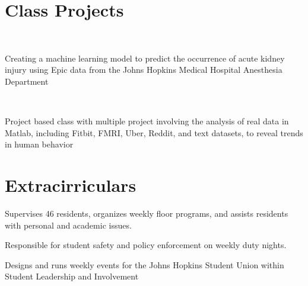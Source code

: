 \documentclass[]{deedy-resume}
\begin{document}
\begin{minipage}[t]{0.66\textwidth} 
\section{Class Projects}
 \\
\vspace{\topsep} %
\begin{tightemize}
\item Creating a machine learning model to predict the occurrence of acute kidney injury using Epic data from the Johns Hopkins Medical Hospital Anesthesia Department
\end{tightemize}
\sectionsep

 \\
\begin{tightemize}
\item Project based class with multiple project involving the analysis of real data in Matlab, including Fitbit, FMRI, Uber, Reddit, and text datasets, to reveal trends in human behavior
\end{tightemize}
\sectionsep



\section{Extracirriculars}
\begin{tightemize}
\item Supervises 46 residents, organizes weekly floor programs, and assists residents with personal and academic issues.
\item Responsible for student safety and policy enforcement on weekly duty nights.
\end{tightemize}
\sectionsep

\begin{tightemize}
\item Designs and runs weekly events for the Johns Hopkins Student Union within Student Leadership and Involvement
\end{tightemize}
\sectionsep

\end{minipage}
\end{document}
